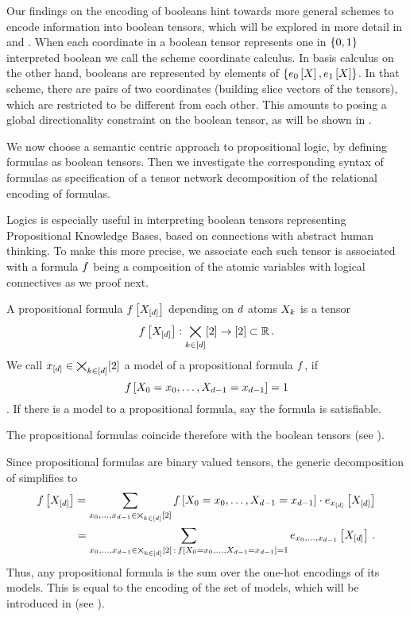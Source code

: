 
Our findings on the encoding of booleans hint towards more general schemes to encode information into boolean tensors, which will be explored in more detail in  and .
When each coordinate in a boolean tensor represents one in $\{0,1\}$ interpreted boolean we call the scheme coordinate calculus.
In basis calculus on the other hand, booleans are represented by elements of $\{e_0\left[X\right],e_1\left[X\right]\}$.
In that scheme, there are pairs of two coordinates (building slice vectors of the tensors), which are restricted to be different from each other.
This amounts to posing a global directionality constraint on the boolean tensor, as will be shown in .


We now choose a semantic centric approach to propositional logic, by defining formulas as boolean tensors.
Then we investigate the corresponding syntax of formulas as specification of a tensor network decomposition of the relational encoding of formulas.


Logics is especially useful in interpreting boolean tensors representing Propositional Knowledge Bases, based on connections with abstract human thinking.
To make this more precise, we associate each such tensor is associated with a formula $f$ being a composition of the atomic variables with logical connectives as we proof next.

\begin{definition}\label{def:formulas}
	A propositional formula $f\left[X_{[d]}\right]$ depending on $d$ atoms $X_{k}$ is a tensor
		\[ f\left[X_{[d]}\right] : \bigtimes_{k\in[d]}[2] \rightarrow [2] \subset \mathbb{R} \, . \]
	We call $x_{[d]} \in \bigtimes_{k\in[d]}[2]$ a model of a propositional formula $f$, if 
		\[ f\left[X_{0}=x_{0},\ldots,X_{d-1}=x_{d-1}\right]=1 \].
	If there is a model to a propositional formula, say the formula is satisfiable.
\end{definition}

The propositional formulas coincide therefore with the boolean tensors (see ).


Since propositional formulas are binary valued tensors, the generic decomposition of  simplifies to
\begin{align}\label{eq:formulaModelDecomposition}
	f\left[X_{[d]}\right] = \sum_{x_{0},\ldots,x_{d-1}\in\bigtimes_{k\in[d]}[2]} f\left[X_{0}=x_{0},\ldots,X_{d-1}=x_{d-1}\right] \cdot e_{x_{[d]}}\left[X_{[d]}\right] \\
	= \sum_{x_{0},\ldots,x_{d-1}\in\bigtimes_{k\in[d]}[2] \, : \, f\left[X_{0}=x_{0},\ldots,X_{d-1}=x_{d-1}\right]=1}  e_{x_{0},\ldots,x_{d-1}}\left[X_{[d]}\right] \, .
\end{align}
Thus, any propositional formula is the sum over the one-hot encodings of its models.
This is equal to the encoding of the set of models, which will be introduced in  (see ).

